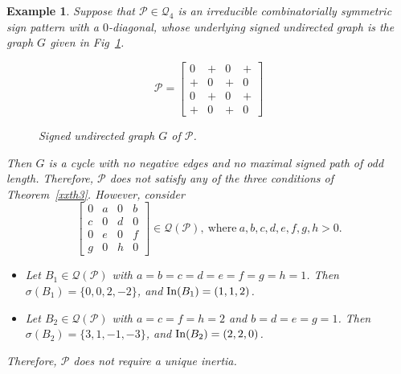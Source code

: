\documentclass[a4paper, 10pt]{article}
\newtheorem{eg}{Example}[section]
\numberwithin{equation}{section}
\def\In{{\rm In}}
\begin{document}
\begin{eg}\label{egxx0.6} Suppose that $\mathcal{P}\in \mathcal{Q}_4$ is an irreducible combinatorially symmetric sign pattern with a $0$-diagonal, whose underlying signed undirected graph is the graph $G$ given in Fig~\ref{xfig3.37}.
	\begin{figure}[H]
		\centering
		\begin{minipage}{.45\textwidth}
			\vspace{-1cm}
			\[
			\mathcal{P}=
			\begin{bmatrix}
				0 & + & 0 & + \\
				+ & 0 & + & 0 \\
				0 & + & 0 & + \\
				+ & 0 & + & 0
			\end{bmatrix}
			\]
		\end{minipage}
		\hspace{0.05\textwidth}
		\begin{minipage}{.45\textwidth}
			\centering
			\tikzset{node distance=1cm}
			\caption{Signed undirected graph $ G$ of $\mathcal{P}$.}
			\label{xfig3.37}
		\end{minipage}
	\end{figure}
	
	Then $G$ is a cycle with no negative edges and no maximal signed path of odd length. Therefore, $\mathcal{P}$ does not satisfy any of the three conditions
	of Theorem~\ref{xxth3}. However, consider	$$\begin{bmatrix}
		0&a&0&b\\ c&0&d&0\\ 0&e&0&f\\ g&0&h&0
	\end{bmatrix}\in \mathcal{Q}(\mathcal{P}), ~\text{where}~ a,b,c,d,e,f,g,h>0.$$ \begin{itemize}
		\item[i.] Let $B_1 \in \mathcal{Q}(\mathcal{P})$ with $a = b = c = d = e = f = g = h = 1$. Then $\sigma(B_1) = \{0, 0, 2, -2\}$, and $\In(B_1) = (1, 1, 2)$.
		\item[ii.] Let $B_2 \in \mathcal{Q}(\mathcal{P})$ with $a = c = f = h = 2$ and $b=d=e=g = 1$. Then $\sigma(B_2) = \{3, 1, -1, -3\}$, and $\In(B_2) = (2, 2, 0)$.
	\end{itemize}
	
	Therefore, $\mathcal{P}$ does not require a unique inertia.
\end{eg}
\end{document}
